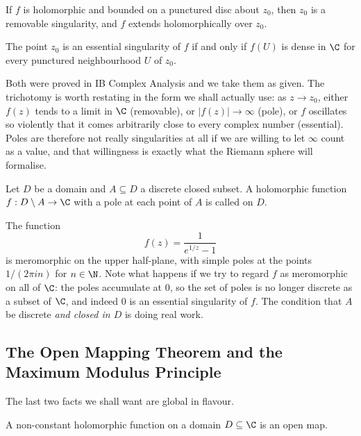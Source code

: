 \begin{theorem}\label{thm:removable}
	If $f$ is holomorphic and bounded on a punctured disc about $z_0$, then $z_0$ is a
	removable singularity, and $f$ extends holomorphically over $z_0$.
\end{theorem}

\begin{theorem}\label{thm:casorati}
	The point $z_0$ is an essential singularity of $f$ if and only if $f(U)$ is dense in
	$\C$ for every punctured neighbourhood $U$ of $z_0$.
\end{theorem}

Both were proved in IB Complex Analysis and we take them as given. The trichotomy is
worth restating in the form we shall actually use: as $z \to z_0$, either $f(z)$ tends to
a limit in $\C$ (removable), or $|f(z)| \to \infty$ (pole), or $f$ oscillates so violently
that it comes arbitrarily close to every complex number (essential). Poles are therefore
not really singularities at all if we are willing to let $\infty$ count as a value, and
that willingness is exactly what the Riemann sphere will formalise.

\begin{definition}
	Let $D$ be a domain and $A \subseteq D$ a discrete closed subset. A holomorphic
	function $f : D \setminus A \to \C$ with a pole at each point of $A$ is called
	 on $D$.
\end{definition}

\begin{example}
	The function
	$$
	f(z) = \frac{1}{e^{1/z} - 1}
	$$
	is meromorphic on the upper half-plane, with simple poles at the points
	$1/(2\pi i n)$ for $n \in \N$. Note what happens if we try to regard $f$ as meromorphic
	on all of $\C$: the poles accumulate at $0$, so the set of poles is no longer discrete
	as a subset of $\C$, and indeed $0$ is an essential singularity of $f$. The condition
	that $A$ be discrete \emph{and closed in $D$} is doing real work.
\end{example}

\subsection{The Open Mapping Theorem and the Maximum Modulus Principle}

The last two facts we shall want are global in flavour.

\begin{theorem}\label{thm:omtplane}
	A non-constant holomorphic function on a domain $D \subseteq \C$ is an open map.
\end{theorem}


